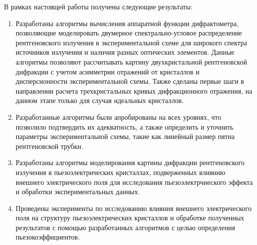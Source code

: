   В рамках настоящей работы получены следующие результаты:
\begin{enumerate}
\item Разработаны алгоритмы вычисления аппаратной функции дифрактометра, позволяющие моделировать
двумерное спектрально-угловое распределение рентгеновского излучения в экспериментальной схеме
для широкого спектра источников излучения и наличия разных оптических элементов.
Данные алгоритмы позволяют рассчитывать картину двухкристальной рентгеновской дифракции с учетом
асимметрии отражений от кристаллов и дисперсионности экспериментальной схемы.
 Также сделаны первые шаги в направлении расчета трехкристальных кривых дифракционного
отражения, на данном этапе только для случая идеальных кристаллов.

\item Разработанные алгоритмы были апробированы на всех уровнях, что позволило подтвердить их адекватность,
а также определить и уточнить параметры экспериментальной схемы, такие как линейный размер пятна
рентгеновской трубки.

\item  Разработаны алгоритмы моделирования картины дифракции рентгеновского излучения в
пьезоэлектрических кристаллах, подверженных
влиянию внешнего электрического поля для исследования пьезоэлектрчиеского эффекта и обработки
экспериментальных данных.

\item Проведены эксперименты по исследованию влияния внешнего электрического поля на структуру
пьезоэлектрических кристаллов и обработке полученных результатов с помощью разработанных алгоритмов
с целью определения пьезокоэффициентов.
\end{enumerate}
